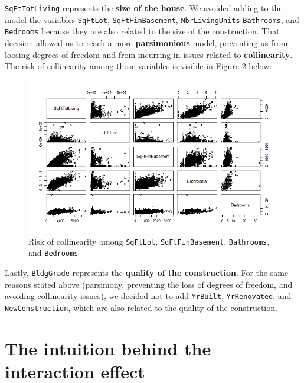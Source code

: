 \documentclass[12pt,a4paper]{article}
\begin{document}
		 
	
	\noindent \texttt{SqFtTotLiving} represents the \textbf{size of the house}. We avoided adding to the model the variables \texttt{SqFtLot}, \texttt{SqFtFinBasement}, \texttt{NbrLivingUnits} \texttt{Bathrooms}, and \texttt{Bedrooms} because they are also related to the size of the construction. That decision allowed us to reach a more \textbf{parsimonious} model, preventing us from loosing degrees of freedom and from incurring in issues related to \textbf{collinearity}. The risk of collinearity among those variables is visible in Figure 2 below: \\
	
		 
	
	\begin{figure}[H]
		\centering
		\includegraphics[width=1\linewidth]{SqFtTotLiving_pairs}
		\caption{Risk of collinearity among \texttt{SqFtLot}, \texttt{SqFtFinBasement}, \texttt{Bathrooms}, and \texttt{Bedrooms}}
		\label{fig:sqfttotlivingpairs}
	\end{figure}
		
	\noindent Lastly, \texttt{BldgGrade} represents the \textbf{quality of the construction}. For the same reasons stated above (parsimony, preventing the loss of degrees of freedom, and avoiding collinearity issues), we decided not to add \texttt{YrBuilt}, \texttt{YrRenovated}, and \texttt{NewConstruction}, which are also related to the quality of the construction. \\
	
\vspace{.5cm}

\section{The intuition behind the interaction effect}
\end{document}
